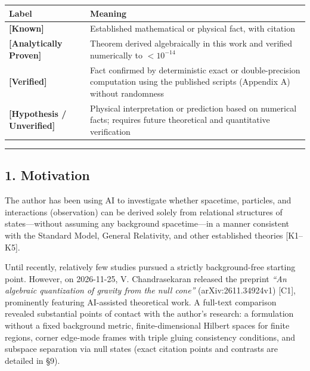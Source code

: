 \documentclass[
  a4paper,
]{article}
\newcounter{none} %
\begin{document}
{\def\LTcaptype{none} %
\begin{longtable}[]{@{}
  >{\raggedright\arraybackslash}p{}
  >{\raggedright\arraybackslash}p{}@{}}
\toprule\noalign{}
\begin{minipage}[b]{\linewidth}\raggedright
Label
\end{minipage} & \begin{minipage}[b]{\linewidth}\raggedright
Meaning
\end{minipage} \\
\midrule\noalign{}
\endhead
\bottomrule\noalign{}
\endlastfoot
\textbf{{[}Known{]}} & Established mathematical or physical fact, with
citation \\
\textbf{{[}Analytically Proven{]}} & Theorem derived algebraically in
this work and verified numerically to \(< 10^{-14}\) \\
\textbf{{[}Verified{]}} & Fact confirmed by deterministic exact or
double-precision computation using the published scripts (Appendix A)
without randomness \\
\textbf{{[}Hypothesis / Unverified{]}} & Physical interpretation or
prediction based on numerical facts; requires future theoretical and
quantitative verification \\
\end{longtable}
}

\begin{center}\rule{0.5\linewidth}{0.5pt}\end{center}

\subsection{1. Motivation}\label{motivation}

The author has been using AI to investigate whether spacetime,
particles, and interactions (observation) can be derived solely from
relational structures of states---without assuming any background
spacetime---in a manner consistent with the Standard Model, General
Relativity, and other established theories {[}K1--K5{]}.

Until recently, relatively few studies pursued a strictly
background-free starting point. However, on 2026-11-25, V.
Chandrasekaran released the preprint \emph{``An algebraic quantization
of gravity from the null cone''} (arXiv:2611.34924v1) {[}C1{]},
prominently featuring AI-assisted theoretical work. A full-text
comparison revealed substantial points of contact with the author's
research: a formulation without a fixed background metric,
finite-dimensional Hilbert spaces for finite regions, corner edge-mode
frames with triple gluing consistency conditions, and subspace
separation via null states (exact citation points and contrasts are
detailed in §9).
\end{document}
